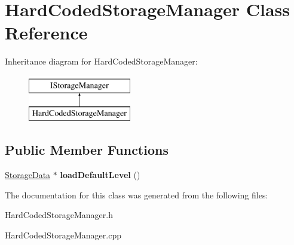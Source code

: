 \hypertarget{class_hard_coded_storage_manager}{}\section{Hard\+Coded\+Storage\+Manager Class Reference}
\label{class_hard_coded_storage_manager}
Inheritance diagram for Hard\+Coded\+Storage\+Manager\+:\begin{figure}[H]
\begin{center}
\leavevmode
\includegraphics[height=2.000000cm]{class_hard_coded_storage_manager}
\end{center}
\end{figure}
\subsection*{Public Member Functions}
\begin{DoxyCompactItemize}
\item 
\mbox{\label{class_hard_coded_storage_manager_a63cb0028398459428f52c88640daf274}} 
\mbox{\hyperlink{class_storage_data}{Storage\+Data}} $\ast$ {\bfseries load\+Default\+Level} ()
\end{DoxyCompactItemize}


The documentation for this class was generated from the following files\+:\begin{DoxyCompactItemize}
\item 
Hard\+Coded\+Storage\+Manager.\+h\item 
Hard\+Coded\+Storage\+Manager.\+cpp\end{DoxyCompactItemize}
